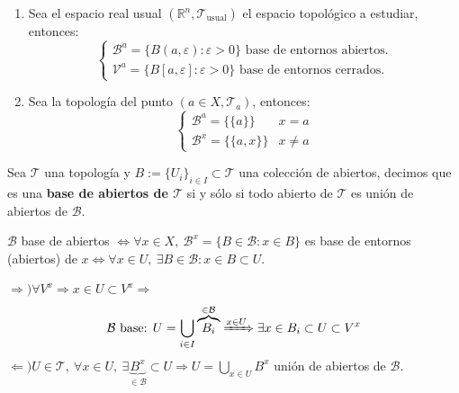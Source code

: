 \begin{ej}
\begin{enumerate}
    \item Sea el espacio real usual $(\mathbb{R}^n, \mathcal{T}_{\text{usual}})$ el espacio topológico a estudiar, entonces:
    $$
    \begin{cases}
    \mathcal{B}^a = \{B\left( a, \varepsilon \right): \varepsilon > 0\} \text{ base de entornos abiertos.}  \\
    \mathcal{V}^a = \{B\left[ a, \varepsilon \right]: \varepsilon > 0\} \text{ base de entornos cerrados.} 
    \end{cases} 
    $$
    \item Sea la topología del punto $(a \in X, \mathcal{T}_a)$, entonces:
	$$
	\begin{cases}
	\mathcal{B}^a = \{\{a\}\} & x = a\\
	\mathcal{B}^x = \{\{a, x\}\} & x \neq a
	\end{cases}
	$$
\end{enumerate}
\end{ej}

\begin{defi}
Sea $\mathcal{T}$ una topología y $B:=\{U_i\}_{i\in I}\subset \mathcal{T}$ una colección de abiertos, decimos que es una \textbf{base de abiertos de $\mathcal{T}$} si y sólo si todo abierto de $\mathcal{T}$ es unión de abiertos de $\mathcal{B}$.
\end{defi}

\begin{prop}

$\mathcal{B}$ base de abiertos $\Leftrightarrow \forall x \in X,\ \mathcal{B}^x = \{B \in \mathcal{B} : x \in B\}$ es base de entornos (abiertos) de $x \Leftrightarrow \forall x \in U,\ \exists B \in \mathcal{B} : x \in B \subset U$.
\end{prop}
\begin{demo}
$\Rightarrow) \forall V^x \Rightarrow x \in U \subset V^x \Rightarrow$
\[
    \mathcal{B} \text{ base: } U = \bigcup_{i \in  I} \overbrace{B_i}^{\in \mathcal{B}} \xRightarrow{x \in U} \exists x \in B_i \subset U \subset V^x
\]
$\Leftarrow) U \in \mathcal{T},\ \forall x \in U,\ \exists \underbrace{B^x}_{\in \mathcal{B}} \subset U \Rightarrow U = \bigcup_{x \in U} B^x$ unión de abiertos de $\mathcal{B}$.
\end{demo}

